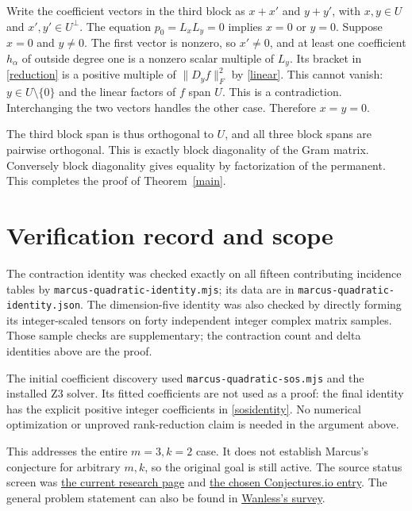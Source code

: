 \documentclass[11pt]{article}
\begin{document}
Write the coefficient vectors in the third block as $x+x'$ and $y+y'$,
with $x,y\in U$ and $x',y'\in U^\perp$. The equation $p_0=L_xL_y=0$
implies $x=0$ or $y=0$. Suppose $x=0$ and $y\ne0$. The first vector is
nonzero, so $x'\ne0$, and at least one coefficient $h_\alpha$ of outside
degree one is a nonzero scalar multiple of $L_y$.
Its bracket in \eqref{reduction} is a positive multiple of
$\|D_y f\|_F^2$ by \eqref{linear}. This cannot vanish: $y\in U\setminus\{0\}$
and the linear factors of $f$ span $U$. This is a contradiction. Interchanging
the two vectors handles the other case. Therefore $x=y=0$.

The third block span is thus orthogonal to $U$, and all three block spans are
pairwise orthogonal. This is exactly block diagonality of the Gram matrix.
Conversely block diagonality gives equality by factorization of the permanent.
This completes the proof of Theorem~\ref{main}.

\section{Verification record and scope}
The contraction identity was checked exactly on all fifteen contributing
incidence tables by \texttt{marcus-quadratic-identity.mjs}; its data are in
\texttt{marcus-quadratic-identity.json}. The dimension-five identity was also
checked by directly forming its integer-scaled tensors on forty independent
integer complex matrix samples. Those sample checks are supplementary; the
contraction count and delta identities above are the proof.

The initial coefficient discovery used \texttt{marcus-quadratic-sos.mjs} and
the installed Z3 solver. Its fitted coefficients are not used as a proof:
the final identity has the explicit positive integer coefficients in
\eqref{sosidentity}. No numerical optimization or unproved rank-reduction
claim is needed in the argument above.

This addresses the entire $m=3,k=2$ case. It does not establish Marcus's
conjecture for arbitrary $m,k$, so the original goal is still active.
The source status screen was
\href{https://yair-lavi.com/mincs-list/conjecture-9/index.html}{the current research page}
and \href{https://conjectures.io/problems/fulloldproblemscatalog-marcusblockpermanent-conjecture}{the chosen Conjectures.io entry}.
The general problem statement can also be found in
\href{https://arxiv.org/html/2202.01867v1}{Wanless's survey}.
\end{document}
